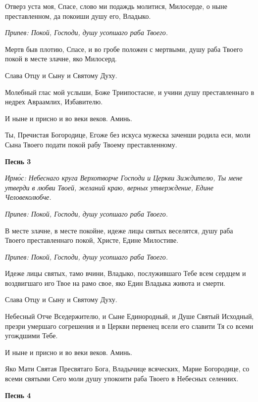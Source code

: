    Отверз уста моя, Спасе, слово ми подаждь молитися, Милосерде, о ныне
преставленном, да покоиши душу его, Владыко.


 \itshape Припев:\normalfont{} Покой, Господи, душу усопшаго раба Твоего.


   Мертв быв плотию, Спасе, и во гробе положен с мертвыми, душу раба
Твоего покой в месте злачне, яко Милосерд.


   Слава Отцу и Сыну и Святому Духу.


   Молебный глас мой услыши, Боже Триипостасне, и учини душу
преставленнаго в недрех Авраамлих, Избавителю.


   И ныне и присно и во веки веков. Аминь.


   Ты, Пречистая Богородице, Егоже без искуса мужеска заченши родила
еси, моли Сына Твоего подати покой рабу Твоему преставленному.



 

\bfseries Песнь 3\normalfont{}


 \itshape Ирмо́с:\normalfont{} Небеснаго круга Верхотворче Господи и Церкви Зиждителю, Ты
мене утверди в любви Твоей, желаний краю, верных утверждение, Едине
Человеколюбче.


 \itshape Припев:\normalfont{} Покой, Господи, душу усопшаго раба Твоего.


   В месте злачне, в месте покойне, идеже лицы святых веселятся, душу
раба Твоего преставленнаго покой, Христе, Едине Милостиве.


 \itshape Припев:\normalfont{} Покой, Господи, душу усопшаго раба Твоего.


   Идеже лицы святых, тамо вчини, Владыко, послужившаго Тебе всем
сердцем и воздвигшаго иго Твое на рамо свое, яко Един Владыка живота и
смерти.


   Слава Отцу и Сыну и Святому Духу.


   Небесный Отче Вседержителю, и Сыне Единородный, и Душе Святый
Исходный, презри умершаго согрешения и в Церкви первенец всели его
славити Тя со всеми угождшими Тебе.


   И ныне и присно и во веки веков. Аминь.


   Яко Мати Святая Пресвятаго Бога, Владычице всяческих, Марие
Богородице, со всеми святыми Сего моли душу упокоити раба Твоего в
Небесных селениих.



 

\bfseries Песнь 4\normalfont{}


